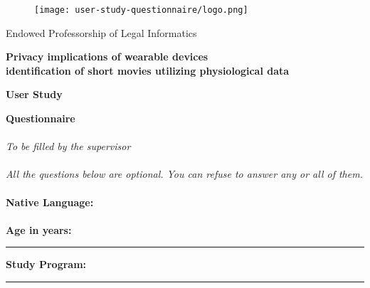 \documentclass[12pt,fleqn]{scrreprt}
\begin{document}
\begin{figure}
\centering
    \texttt{[image: user-study-questionnaire/logo.png]}
\end{figure}

\begin{center}
{\LARGE Endowed Professorship of Legal Informatics}
\end{center}
\begin{center}
{\large \bf Privacy implications of wearable devices \\ identification of short movies utilizing physiological data}
\end{center}
\begin{center}
{\bf User Study}
\end{center}
\begin{center}
{\Huge \bf Questionnaire}
\end{center}

\paragraph{}
\textit{To be filled by the supervisor}
\paragraph{}
\paragraph{}
\textit{All the questions below are optional. You can refuse to answer any or all of them.}
\paragraph{}
{\bf Native Language: } \linetext{}
\paragraph{}
\paragraph{}
{\bf Age in years: } \rule{2cm}{0.4pt} \hspace{1.4cm}
{\bf Study Program: } \rule{6cm}{0.4pt}
\end{document}
